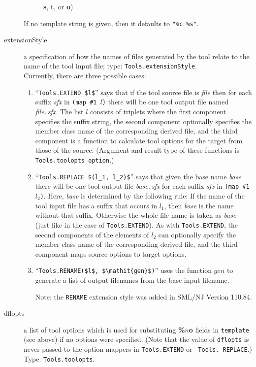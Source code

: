 \begin{description}
\begin{description}
        {\bf s}, {\bf t}, or {\bf o})
      \end{description}%
    If no template string is given, then it defaults to {\tt "\%c \%s"}.
  \item[extensionStyle] a specification of how the names of files
    generated by the tool relate to the name of the tool input file;
    type: {\tt Tools.extensionStyle}. \\
    Currently, there are three possible cases:
    \begin{enumerate}
      \item
        ``\lstinline[mathescape=true]@Tools.EXTEND $l$@'' says that if the tool source file is
        {\it file} then for each suffix {\it sfx} in {\tt (map \#1 $l$)} there
        will be one tool output file named {\it file}{\tt .}{\it sfx}.  The
        list $l$ consists of triplets where the first component specifies the
        suffix string, the second component optionally specifies the
        member class name of the corresponding derived file, and the
        third component is a function to calculate tool options for the
        target from those of the source. (Argument and result type of these
        functions is {\tt Tools.toolopts option}.)
      \item
        ``\lstinline[mathescape=true]!Tools.REPLACE $(l_1, l_2)$!'' says that given the
        base name {\it base} there will be one tool output file
        {\it base}{\tt .}{\it sfx} for each suffix {\it sfx} in {\tt (map \#1 $l_2$)}.
        Here, {\it base} is determined by the following rule: If the name of the
        tool input file has a suffix that occurs in $l_1$, then {\it base} is
        the name without that suffix.  Otherwise the whole file name is taken
        as {\it base} (just like in the case of {\tt Tools.EXTEND}).  As with
        {\tt Tools.EXTEND}, the second components of the elements of $l_2$ can
        optionally specify the member class name of the corresponding derived
        file, and the third component maps source options to target options.
      \item
        ``\lstinline[mathescape=true]!Tools.RENAME($l$, $\mathit{gen}$)!'' uses the
        function $\mathit{gen}$ to generate a list of output filenames from the
        base input filename.

        Note: the \lstinline!RENAME! extension style was added in SML/NJ Version 110.84.
    \end{enumerate}
  \item[dflopts] a list of tool options which is used for
    substituting {\bf \%$n$o} fields in {\tt template} (see above) if no
    options were specified.  (Note that the value of {\tt dflopts} is never
    passed to the option mappers in {\tt Tools.EXTEND} or {\tt
    Tools. REPLACE}.)  Type: {\tt Tools.toolopts}.
\end{description}%

